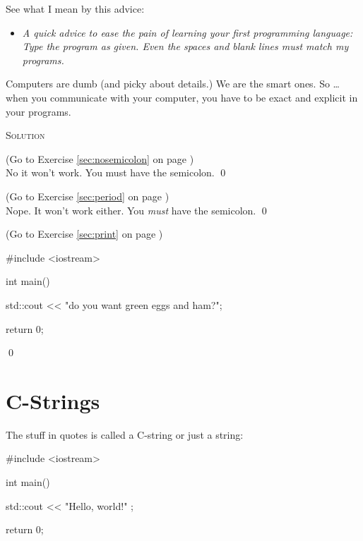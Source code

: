


See what I mean by this advice:

\begin{itemize}
\item[]
\textit{A quick advice to ease the pain of learning your first programming 
language: Type the program 
 as given. 
Even the spaces and blank lines must match my programs.}
\end{itemize}

Computers are dumb (and picky about details.) 
We are the smart ones. So … when you communicate with your computer, 
you have to be exact and explicit in your programs.





\newpage\textsc{Solution}

\begin{soln}
\label{sec:nosemicolon_soln} 
(Go to Exercise \ref{sec:nosemicolon} 
on page \pageref{sec:nosemicolon})
\\
No it won't work. 
You must have the semicolon.
\qed
\end{soln}


\begin{soln}
\label{sec:period_soln} 
(Go to Exercise \ref{sec:period} 
on page \pageref{sec:period})
\\
Nope. It won't work either. 
You \textit{must} have the semicolon.
\qed
\end{soln}


\begin{soln}
\label{sec:print_soln} 
(Go to Exercise \ref{sec:print} 
on page \pageref{sec:print})
\begin{console}
#include <iostream>

int main()
{
    std::cout << "do you want green eggs and ham?\n";

    return 0;
}
\end{console}
\qed
\end{soln}

\newpage\section{C-Strings}

The stuff in quotes is called a C-string or just a string:
\begin{console}
#include <iostream>

int main()
{
    std::cout << "Hello, world!\n" ;

    return 0;
}
\end{console}

